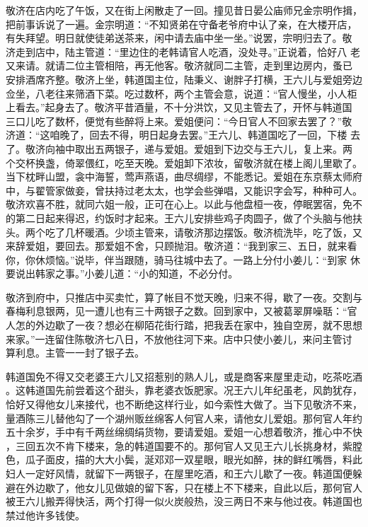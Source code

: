 敬济在店内吃了午饭，又在街上闲散走了一回。撞见昔日晏公庙师兄金宗明作揖，
把前事诉说了一遍。金宗明道：“不知贤弟在守备老爷府中认了亲，在大楼开店，
有失拜望。明日就使徒弟送茶来，闲中请去庙中坐一坐。”说罢，宗明归去了。敬
济走到店中，陆主管道：“里边住的老韩请官人吃酒，没处寻。”正说着，恰好八
老又来请。就请二位主管相陪，再无他客。敬济就同二主管，走到里边房内，蚤已
安排酒席齐整。敬济上坐，韩道国主位，陆秉义、谢胖子打横，王六儿与爱姐旁边
佥坐，八老往来筛酒下菜。吃过数杯，两个主管会意，说道：“官人慢坐，小人柜
上看去。”起身去了。敬济平昔酒量，不十分洪饮，又见主管去了，开怀与韩道国
三口儿吃了数杯，便觉有些醉将上来。爱姐便问：“今日官人不回家去罢了？”敬
济道：“这咱晚了，回去不得，明日起身去罢。”王六儿、韩道国吃了一回，下楼
去了。敬济向袖中取出五两银子，递与爱姐。爱姐到下边交与王六儿，复上来。两
个交杯换盏，倚翠偎红，吃至天晚。爱姐卸下浓妆，留敬济就在楼上阁儿里歇了。
当下枕畔山盟，衾中海誓，莺声燕语，曲尽绸缪，不能悉记。爱姐在东京蔡太师府
中，与翟管家做妾，曾扶持过老太太，也学会些弹唱，又能识字会写，种种可人。
敬济欢喜不胜，就同六姐一般，正可在心上。以此与他盘桓一夜，停眠罢宿，免不
的第二日起来得迟，约饭时才起来。王六儿安排些鸡子肉圆子，做了个头脑与他扶
头。两个吃了几杯暖酒。少顷主管来，请敬济那边摆饭。敬济梳洗毕，吃了饭，又
来辞爱姐，要回去。那爱姐不舍，只顾抛泪。敬济道：“我到家三、五日，就来看
你，你休烦恼。”说毕，伴当跟随，骑马往城中去了。一路上分付小姜儿：“到家
休要说出韩家之事。”小姜儿道：“小的知道，不必分付。

敬济到府中，只推店中买卖忙，算了帐目不觉天晚，归来不得，歇了一夜。交割与
春梅利息银两，见一遭儿也有三十两银子之数。回到家中，又被葛翠屏噪聒：“官
人怎的外边歇了一夜？想必在柳陌花街行踏，把我丢在家中，独自空房，就不思想
来家。”一连留住陈敬济七八日，不放他往河下来。店中只使小姜儿，来问主管讨
算利息。主管一一封了银子去。

韩道国免不得又交老婆王六儿又招惹别的熟人儿，或是商客来屋里走动，吃茶吃酒
。这韩道国先前尝着这个甜头，靠老婆衣饭肥家。况王六儿年纪虽老，风韵犹存，
恰好又得他女儿来接代，也不断绝这样行业，如今索性大做了。当下见敬济不来，
量酒陈三儿替他勾了一个湖州贩丝绵客人何官人来，请他女儿爱姐。那何官人年约
五十余岁，手中有千两丝绵绸绢货物，要请爱姐。爱姐一心想着敬济，推心中不快
，三回五次不肯下楼来，急的韩道国要不的。那何官人又见王六儿长挑身材，紫膛
色，瓜子面皮，描的大大小鬓，涎邓邓一双星眼，眼光如醉，抹的鲜红嘴唇，料此
妇人一定好风情，就留下一两银子，在屋里吃酒，和王六儿歇了一夜。韩道国便躲
避在外边歇了，他女儿见做娘的留下客，只在楼上不下楼来，自此以后，那何官人
被王六儿搬弄得快活，两个打得一似火炭般热，没三两日不来与他过夜。韩道国也
禁过他许多钱使。

